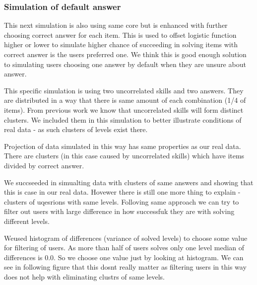 \documentclass[
  digital, %
  table,   %
  nolof,     %
  nolot,     %
  nocover
]{fithesis3}
\begin{document}
\subsubsection{Simulation of default answer}\label{simulation-of-default-answer}

This next simulation is also using same core but is enhanced with further choosing correct answer for each item. This is used to offset logistic function higher or lower to simulate higher chance of succeeding in solving items with correct answer is the users preferred one. We think this is good enough solution to simulating users choosing one answer by default when they are unsure about answer.

This specific simulation is using two uncorrelated skills and two answers. They are distributed in a way that there is same amount of each combination (1/4 of items). From previous work we know that uncorrelated skills will form distinct clusters. We included them in this simulation to better illustrate conditions of real data - as such clusters of levels exist there.

Projection of data simulated in this way has same properties as our real data. There are clusters (in this case caused by uncorrelated skills) which have items divided by correct answer.


We succseeded in simualting data with clusters of same answers and
showing that this is case in our real data. Hovewer there is still one
more thing to explain - clusters of uqesrions with same levels.
Folloving same approach we can try to filter out users with large
difference in how successfuk they are with solving different levels.

Weused histogram of differences (variance of solved levels) to choose
some value for filtering of users. As more than half of users solves
only one level median of differences is 0.0. So we choose one value just
by looking at histogram. We can see in following figure that this dosnt
really matter as filtering users in this way does not help with
eliminating clustrs of same levels.

\end{document}
